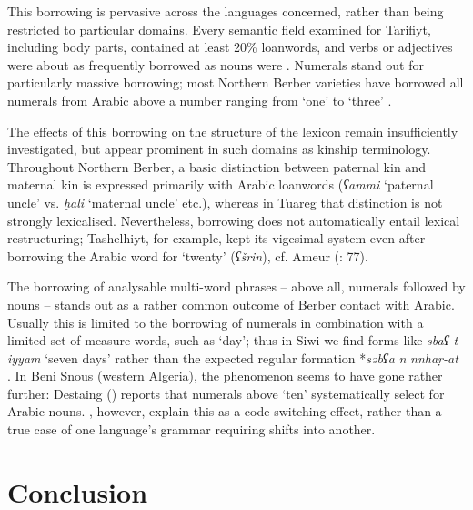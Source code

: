 \documentclass[output=paper]{langsci/langscibook}
\begin{document}
This borrowing is pervasive across the languages concerned, rather than being restricted to particular domains. Every semantic field examined for Tarifiyt, including body parts, contained at least 20\% loanwords, and verbs or adjectives were about as frequently borrowed as nouns were \citep{Kossmann2009}. Numerals stand out for particularly massive borrowing; most Northern Berber varieties have borrowed all numerals from Arabic above a number ranging from `one' to `three' \citep{Souag2007}.

The effects of this borrowing on the structure of the lexicon remain insufficiently investigated, but appear prominent in such domains as kinship terminology. Throughout Northern Berber, a basic distinction between paternal kin and maternal kin is expressed primarily with Arabic loanwords (\textit{ʕammi} `paternal uncle' vs. \textit{ḫali} `maternal uncle' etc.), whereas in Tuareg that distinction is not strongly lexicalised. Nevertheless, borrowing does not automatically entail lexical restructuring; Tashelhiyt, for example, kept its vigesimal system even after borrowing the Arabic word for `twenty' (\textit{ʕšrin}), cf. Ameur (\citeyear{Ameur2008}: 77).

The borrowing of analysable multi-word phrases – above all, numerals followed by nouns – stands out as a rather common outcome of Berber contact with Arabic. Usually this is limited to the borrowing of numerals in combination with a limited set of measure words, such as `day'; thus in Siwi we find forms like \textit{sbaʕ-t} \textit{iyyam} `seven days' rather than the expected regular formation *\textit{səbʕa} \textit{n} \textit{nnhaṛ-at }\citep[114]{Souag2013book}. In Beni Snous (western Algeria), the phenomenon seems to have gone rather further: Destaing (\citeyear[212]{Destaing1907}) reports that numerals above `ten' systematically select for Arabic nouns.  \citet{SouagKherbache2016}, however, explain this as a code-switching effect, rather than a true case of one language's grammar requiring shifts into another.
\largerpage

\section{Conclusion}
\end{document}

